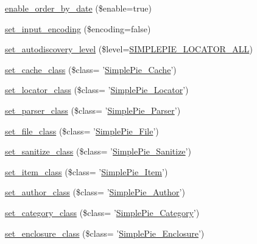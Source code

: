 \begin{DoxyCompactItemize}
\item 
\hyperlink{class_simple_pie_a8ee93aa09f5945360ea392bf0ec1e12b}{enable\-\_\-order\-\_\-by\-\_\-date} (\$enable=true)
\item 
\hyperlink{class_simple_pie_adc0b40b916ce8a40955867445a3f4b0e}{set\-\_\-input\-\_\-encoding} (\$encoding=false)
\item 
\hyperlink{class_simple_pie_a4143ba9d144fe53d73c2f2a4f4136371}{set\-\_\-autodiscovery\-\_\-level} (\$level=\hyperlink{simplepie_8inc_a77835b708f60cde39bf93958e683a5f1}{S\-I\-M\-P\-L\-E\-P\-I\-E\-\_\-\-L\-O\-C\-A\-T\-O\-R\-\_\-\-A\-L\-L})
\item 
\hyperlink{class_simple_pie_a8f78e09a7237a5717d377fa986da2b68}{set\-\_\-cache\-\_\-class} (\$class= '\hyperlink{class_simple_pie___cache}{Simple\-Pie\-\_\-\-Cache}')
\item 
\hyperlink{class_simple_pie_ada5cda1fa555006b773889675fc3adb3}{set\-\_\-locator\-\_\-class} (\$class= '\hyperlink{class_simple_pie___locator}{Simple\-Pie\-\_\-\-Locator}')
\item 
\hyperlink{class_simple_pie_a76edb05c1b0751ee1e782581605f1ff4}{set\-\_\-parser\-\_\-class} (\$class= '\hyperlink{class_simple_pie___parser}{Simple\-Pie\-\_\-\-Parser}')
\item 
\hyperlink{class_simple_pie_aba2a8fdc09a6b481774a7231eeb8b072}{set\-\_\-file\-\_\-class} (\$class= '\hyperlink{class_simple_pie___file}{Simple\-Pie\-\_\-\-File}')
\item 
\hyperlink{class_simple_pie_ae55b44b06554520d80d429a2812b3247}{set\-\_\-sanitize\-\_\-class} (\$class= '\hyperlink{class_simple_pie___sanitize}{Simple\-Pie\-\_\-\-Sanitize}')
\item 
\hyperlink{class_simple_pie_a4dabbdd35550eb871d85cba405205c0b}{set\-\_\-item\-\_\-class} (\$class= '\hyperlink{class_simple_pie___item}{Simple\-Pie\-\_\-\-Item}')
\item 
\hyperlink{class_simple_pie_a3dba95adf5c7f6183434dccdfb109066}{set\-\_\-author\-\_\-class} (\$class= '\hyperlink{class_simple_pie___author}{Simple\-Pie\-\_\-\-Author}')
\item 
\hyperlink{class_simple_pie_a442595fb83191e799513e5fc24feb092}{set\-\_\-category\-\_\-class} (\$class= '\hyperlink{class_simple_pie___category}{Simple\-Pie\-\_\-\-Category}')
\item 
\hyperlink{class_simple_pie_a2579877ba12d7904ffb26062adbee242}{set\-\_\-enclosure\-\_\-class} (\$class= '\hyperlink{class_simple_pie___enclosure}{Simple\-Pie\-\_\-\-Enclosure}')
\item 

\end{DoxyCompactItemize}
